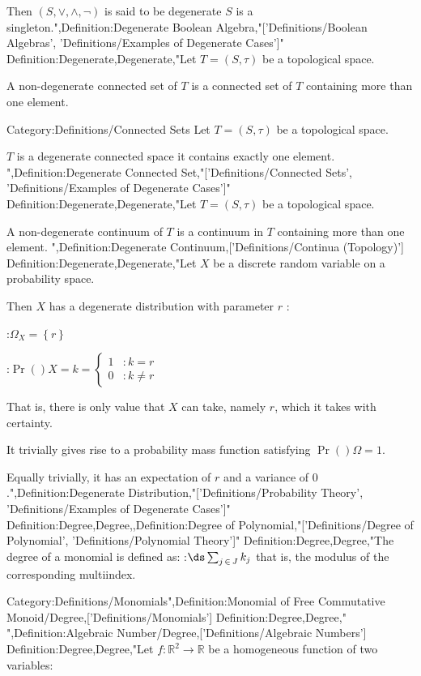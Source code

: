 Then $\left( S, \vee, \wedge, \neg \right)$ is said to be degenerate  $S$ is a singleton.",Definition:Degenerate Boolean Algebra,"['Definitions/Boolean Algebras', 'Definitions/Examples of Degenerate Cases']"
Definition:Degenerate,Degenerate,"Let $T = \left({S, \tau}\right)$ be a topological space.


A non-degenerate connected set of $T$ is a connected set of $T$ containing more than one element.


Category:Definitions/Connected Sets
Let $T = \left( S, \tau \right)$ be a topological space.


$T$ is a degenerate connected space  it contains exactly one element.
",Definition:Degenerate Connected Set,"['Definitions/Connected Sets', 'Definitions/Examples of Degenerate Cases']"
Definition:Degenerate,Degenerate,"Let $T = \left( S, \tau \right)$ be a topological space.


A non-degenerate continuum of $T$ is a continuum in $T$ containing more than one element.
",Definition:Degenerate Continuum,['Definitions/Continua (Topology)']
Definition:Degenerate,Degenerate,"Let $X$ be a discrete random variable on a probability space.


Then $X$ has a degenerate distribution with parameter $r$ :

:$\Omega_X = \left\lbrace r \right\rbrace$

:$\Pr \left(   \right){X = k} = \begin {cases}
1 & : k = r \\
0 & : k \ne r
\end {cases}$

That is, there is only value that $X$ can take, namely $r$, which it takes with certainty.




It trivially gives rise to a probability mass function satisfying $\Pr \left(   \right)\Omega = 1$.

Equally trivially, it has an expectation of $r$ and a variance of $0$.",Definition:Degenerate Distribution,"['Definitions/Probability Theory', 'Definitions/Examples of Degenerate Cases']"
Definition:Degree,Degree,,Definition:Degree of Polynomial,"['Definitions/Degree of Polynomial', 'Definitions/Polynomial Theory']"
Definition:Degree,Degree,"The degree of a monomial is defined as:
:$\ds \sum_{j \mathop \in J} k_j$
that is, the modulus of the corresponding multiindex.


Category:Definitions/Monomials",Definition:Monomial of Free Commutative Monoid/Degree,['Definitions/Monomials']
Definition:Degree,Degree,"
",Definition:Algebraic Number/Degree,['Definitions/Algebraic Numbers']
Definition:Degree,Degree,"Let $f: \mathbb R^2 \to \mathbb R$ be a homogeneous function of two variables:

